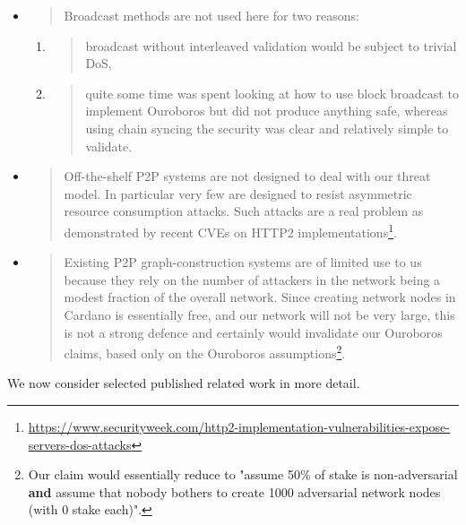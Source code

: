 \documentclass[11pt,a4paper]{article}
\begin{document}
\begin{itemize}
\item
  \begin{quote}
  Broadcast methods are not used here for two reasons:
  \end{quote}

  \begin{enumerate}
  \def\labelenumi{\alph{enumi}.}
  \item
    \begin{quote}
    broadcast without interleaved validation would be subject to trivial
    DoS,
    \end{quote}
  \item
    \begin{quote}
    quite some time was spent looking at how to use block broadcast to
    implement Ouroboros but did not produce anything safe, whereas using
    chain syncing the security was clear and relatively simple to
    validate.
    \end{quote}
  \end{enumerate}
\item
  \begin{quote}
  Off-the-shelf P2P systems are not designed to deal with our threat
  model. In particular very few are designed to resist asymmetric
  resource consumption attacks. Such attacks are a real problem as
  demonstrated by recent CVEs on HTTP2 implementations\footnote{\href{https://www.securityweek.com/http2-implementation-vulnerabilities-expose-servers-dos-attacks}{{https://www.securityweek.com/http2-implementation-vulnerabilities-expose-servers-dos-attacks}}}.
  \end{quote}
\item
  \begin{quote}
  Existing P2P graph-construction systems are of limited use to us
  because they rely on the number of attackers in the network being a
  modest fraction of the overall network. Since creating network nodes
  in Cardano is essentially free, and our network will not be very
  large, this is not a strong defence and certainly would invalidate our
  Ouroboros claims, based only on the Ouroboros assumptions\footnote{Our
    claim would essentially reduce to "assume 50\% of stake is
    non-adversarial \textbf{and} assume that nobody bothers to create
    1000 adversarial network nodes (with 0 stake each)".}.
  \end{quote}
\end{itemize}

We now consider selected published related work in more detail.
\end{document}
